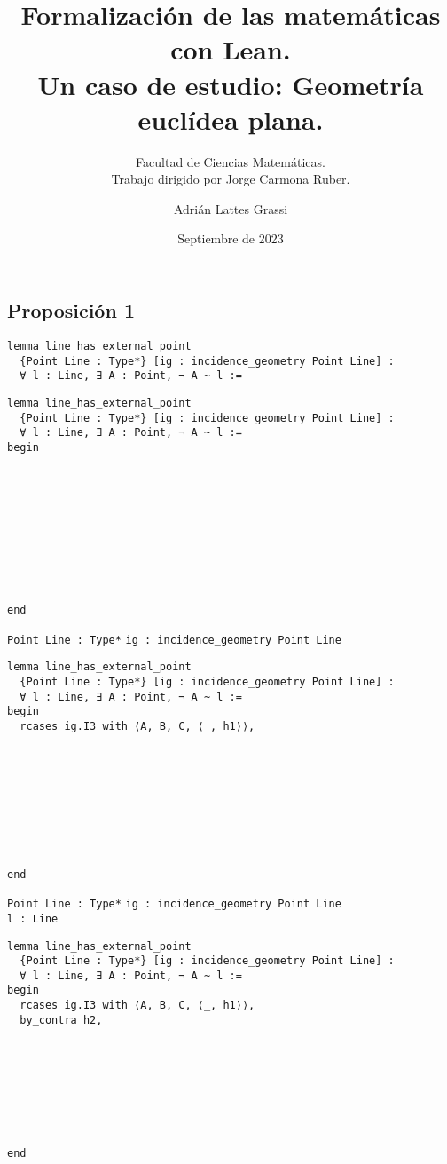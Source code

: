 \documentclass[t]{beamer}
\title{Formalización de las matemáticas con Lean.\\ Un caso de estudio: Geometría euclídea plana.}
\author{Adrián Lattes Grassi}
\date{Septiembre de 2023}
\subtitle{Facultad de Ciencias Matemáticas.\\Trabajo dirigido por Jorge Carmona Ruber.}
\begin{document}
\frame{\titlepage}


\subsection{Proposición 1}

\begin{frame}[fragile]
\begin{lstlisting}
lemma line_has_external_point 
  {Point Line : Type*} [ig : incidence_geometry Point Line] :
  ∀ l : Line, ∃ A : Point, ¬ A ~ l :=
\end{lstlisting}
\end{frame}

\begin{frame}[fragile]
\begin{lstlisting}
lemma line_has_external_point 
  {Point Line : Type*} [ig : incidence_geometry Point Line] :
  ∀ l : Line, ∃ A : Point, ¬ A ~ l :=
begin










end
\end{lstlisting}
\lstinline{Point Line : Type*} \lstinline{ig : incidence_geometry Point Line}\\
\end{frame}

\begin{frame}[fragile]
\begin{lstlisting}
lemma line_has_external_point 
  {Point Line : Type*} [ig : incidence_geometry Point Line] :
  ∀ l : Line, ∃ A : Point, ¬ A ~ l :=
begin
  rcases ig.I3 with ⟨A, B, C, ⟨_, h1⟩⟩,









end
\end{lstlisting}
\lstinline{Point Line : Type*} \lstinline{ig : incidence_geometry Point Line}\\
\lstinline{l : Line}\\
\end{frame}

\begin{frame}[fragile]
\begin{lstlisting}
lemma line_has_external_point 
  {Point Line : Type*} [ig : incidence_geometry Point Line] :
  ∀ l : Line, ∃ A : Point, ¬ A ~ l :=
begin
  rcases ig.I3 with ⟨A, B, C, ⟨_, h1⟩⟩,
  by_contra h2,








end
\end{lstlisting}
\end{frame}
\end{document}
